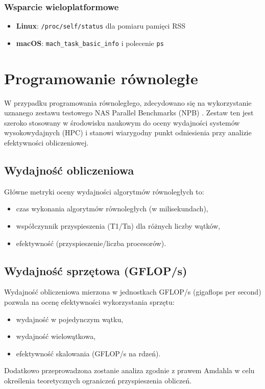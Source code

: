\subsubsection{Wsparcie wieloplatformowe}
\begin{itemize}
    \item \textbf{Linux}: \texttt{/proc/self/status} dla pomiaru pamięci RSS
    \item \textbf{macOS}: \texttt{mach\_task\_basic\_info} i polecenie \texttt{ps}
\end{itemize}

\section{Programowanie równoległe}
W przypadku programowania równoległego, zdecydowano się na wykorzystanie uznanego zestawu testowego NAS Parallel Benchmarks (NPB) \cite{nasaParallelBenchmarks}. Zestaw ten jest szeroko stosowany w środowisku naukowym do oceny wydajności systemów wysokowydajnych (HPC) i stanowi wiarygodny punkt odniesienia przy analizie efektywności obliczeniowej.
\subsection{Wydajność obliczeniowa}
Główne metryki oceny wydajności algorytmów równoległych to:
\begin{itemize}
\item czas wykonania algorytmów równoległych (w milisekundach),
\item współczynnik przyspieszenia (T1/Tn) dla różnych liczby wątków,
\item efektywność (przyspieszenie/liczba procesorów).
\end{itemize}

\subsection{Wydajność sprzętowa (GFLOP/s)}
Wydajność obliczeniowa mierzona w jednostkach GFLOP/s (gigaflops per second) pozwala na ocenę efektywności wykorzystania sprzętu:
\begin{itemize}
\item wydajność w pojedynczym wątku,
\item wydajność wielowątkowa,
\item efektywność skalowania (GFLOP/s na rdzeń).
\end{itemize}
Dodatkowo przeprowadzona zostanie analiza zgodnie z prawem Amdahla w celu określenia teoretycznych ograniczeń przyspieszenia obliczeń.


